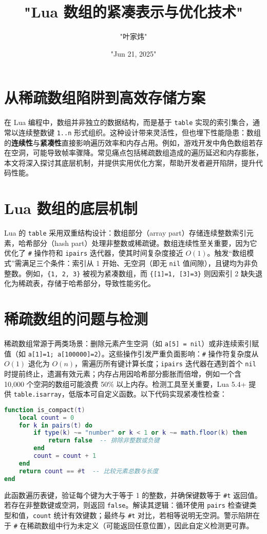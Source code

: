 \title{"Lua 数组的紧凑表示与优化技术"}
\author{"叶家炜"}
\date{"Jun 21, 2025"}
\maketitle
\chapter{从稀疏数组陷阱到高效存储方案}
在 Lua 编程中，数组并非独立的数据结构，而是基于 \texttt{table} 实现的索引集合，通常以连续整数键 \texttt{1..n} 形式组织。这种设计带来灵活性，但也埋下性能隐患：数组的\textbf{连续性}与\textbf{紧凑性}直接影响遍历效率和内存占用。例如，游戏开发中角色数组若存在空洞，可能导致帧率骤降。常见痛点包括稀疏数组造成的遍历延迟和内存膨胀，本文将深入探讨其底层机制，并提供实用优化方案，帮助开发者避开陷阱，提升代码性能。\par
\chapter{Lua 数组的底层机制}
Lua 的 \texttt{table} 采用双重结构设计：数组部分（array part）存储连续整数索引元素，哈希部分（hash part）处理非整数或稀疏键。数组连续性至关重要，因为它优化了 \texttt{\#{}} 操作符和 \texttt{ipairs} 迭代器，使其时间复杂度接近 $O(1)$。触发“数组模式”需满足三个条件：索引从 1 开始、无空洞（即无 \texttt{nil} 值间隙），且键均为非负整数。例如，\texttt{\{{}1, 2, 3\}{}} 被视为紧凑数组，而 \texttt{\{{}[1]=1, [3]=3\}{}} 则因索引 2 缺失退化为稀疏表，存储于哈希部分，导致性能劣化。\par
\chapter{稀疏数组的问题与检测}
稀疏数组常源于两类场景：删除元素产生空洞（如 \texttt{a[5] = nil}）或非连续索引赋值（如 \texttt{a[1]=1; a[100000]=2}）。这些操作引发严重负面影响：\texttt{\#{}} 操作符复杂度从 $O(1)$ 退化为 $O(n)$，需遍历所有键计算长度；\texttt{ipairs} 迭代器在遇到首个 \texttt{nil} 时提前终止，遗漏有效元素；内存占用因哈希部分膨胀而倍增，例如一个含 10,000 个空洞的数组可能浪费 50\%{} 以上内存。检测工具至关重要，Lua 5.4+ 提供 \texttt{table.isarray}，低版本可自定义函数。以下代码实现紧凑性检查：\par
\begin{lstlisting}[language=lua]
function is_compact(t)
    local count = 0
    for k in pairs(t) do
        if type(k) ~= "number" or k < 1 or k ~= math.floor(k) then
            return false  -- 排除非整数或负键
        end
        count = count + 1
    end
    return count == #t  -- 比较元素总数与长度
end
\end{lstlisting}
此函数遍历表键，验证每个键为大于等于 1 的整数，并确保键数等于 \texttt{\#{}t} 返回值。若存在非整数键或空洞，则返回 \texttt{false}。解读其逻辑：循环使用 \texttt{pairs} 检查键类型和值，\texttt{count} 统计有效键数；最终与 \texttt{\#{}t} 对比，若相等说明无空洞。警示陷阱在于 \texttt{\#{}} 在稀疏数组中行为未定义（可能返回任意位置），因此自定义检测更可靠。\par
